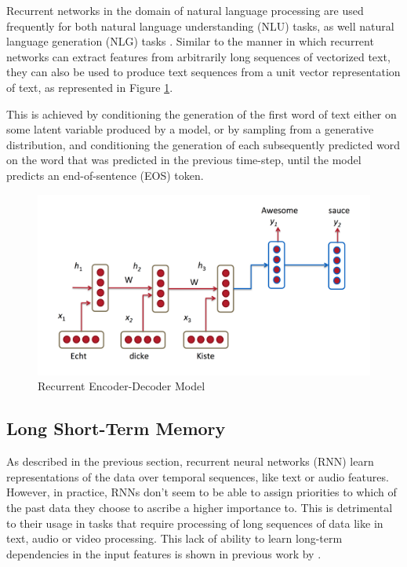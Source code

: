 Recurrent networks in the domain of natural language processing are used frequently for both natural language understanding (NLU) tasks, as well natural language generation (NLG) tasks \citep{bengio2003neural,morin2005hierarchical,mikolov2010recurrent}. Similar to the manner in which recurrent networks can extract features from arbitrarily long sequences of vectorized text, they can also be used to produce text sequences from a unit vector representation of text, as represented in Figure \ref{fig:rnn-nmt}.

This is achieved by conditioning the generation of the first word of text either on some latent variable produced by a model, or by sampling from a generative distribution, and conditioning the generation of each subsequently predicted word on the word that was predicted in the previous time-step, until the model predicts an end-of-sentence (EOS) token.

\begin{figure}[ht]
	\centering
	\includegraphics[width=\textwidth]{images/rnn-nmt}
	\caption{\label{fig:rnn-nmt} Recurrent Encoder-Decoder Model}
\end{figure}


\subsection{Long Short-Term Memory}

As described in the previous section, recurrent neural networks (RNN) learn representations of the data over temporal sequences, like text or audio features. However, in practice, RNNs don't seem to be able to assign priorities to which of the past data they choose to ascribe a higher importance to. This is detrimental to their usage in tasks that require processing of long sequences of data like in text, audio or video processing. This lack of ability to learn long-term dependencies in the input features is shown in previous work by \cite{bengio1994learning}.

